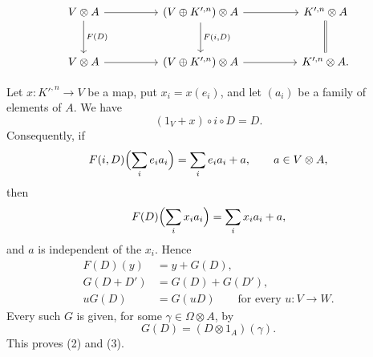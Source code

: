 
\[
\begin{tikzcd}[column sep=huge,row sep=large]
 V\otimes A
   \arrow[r]
   \arrow[d,"{F(D)}"]
 & (V\oplus K'^{,n})\otimes A
   \arrow[r]
   \arrow[d,"{F(i,D)}"]
 & K'^{,n}\otimes A
   \arrow[d,equal]\\
 V\otimes A
   \arrow[r]
 & (V\oplus K'^{,n})\otimes A
   \arrow[r]
 & K'^{,n}\otimes A.
\end{tikzcd}
\]

Let $x:K'^{,n}\longrightarrow V$ be a map, put
$x_i=x(e_i)$, and let $(a_i)$ be a family of elements of $A$. We
have
\[
 (1_V+x)\circ i\circ D=D.
\]
Consequently, if
\[
 F(i,D)\Bigl(\sum_i e_i a_i\Bigr)
 =\sum_i e_i a_i+a,
 \qquad a\in V\otimes A,
\]
then
\[
 F(D)\Bigl(\sum_i x_i a_i\Bigr)
 =\sum_i x_i a_i+a,
\]
and $a$ is independent of the $x_i$. Hence
\[
\begin{aligned}
 F(D)(y)&=y+G(D),\\
 G(D+D')&=G(D)+G(D'),\\
 uG(D)&=G(uD)
   \qquad\text{for every }u:V\longrightarrow W.
\end{aligned}
\]
Every such $G$ is given, for some $\gamma\in\Omega\otimes A$, by
\[
 G(D)=(D\otimes1_A)(\gamma).
\]
This proves (2) and (3).

